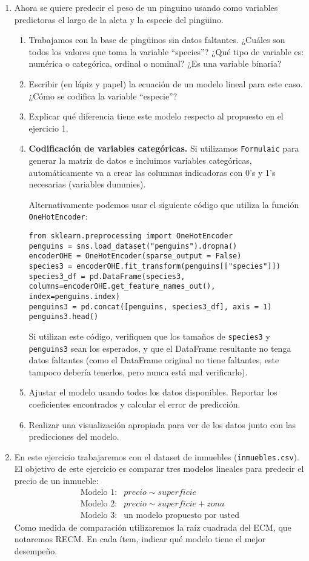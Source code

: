 \documentclass[a4paper,11pt]{article}
\theoremstyle{definition}
\begin{document}
\begin{enumerate}
\item Ahora se quiere predecir el peso de un pinguino usando como variables predictoras el largo de la aleta y la especie del ping\"uino.
\begin{enumerate}
\item Trabajamos con la base de ping\"uinos sin datos faltantes. ¿Cu\'ales son todos los valores que toma la variable ``species''? ¿Qu\'e tipo de variable es: numérica o categórica, ordinal o nominal? ¿Es una variable binaria?
\item Escribir (en lápiz y papel) la ecuación de un modelo lineal para este caso. ¿Cómo se codifica la variable “especie”?
\item Explicar qué diferencia tiene este modelo respecto al propuesto en el ejercicio 1.
\item \textbf{Codificación de variables categóricas.}  Si utilizamos \lstinline{Formulaic} para generar la matriz de datos e incluimos variables categóricas, automáticamente va a crear las columnas indicadoras con 0's y 1's necesarias (variables dummies).
    
    Alternativamente podemos usar el siguiente código que utiliza la función \lstinline{OneHotEncoder}:
\begin{lstlisting}
from sklearn.preprocessing import OneHotEncoder
penguins = sns.load_dataset("penguins").dropna()
encoderOHE = OneHotEncoder(sparse_output = False)
species3 = encoderOHE.fit_transform(penguins[["species"]])
species3_df = pd.DataFrame(species3, columns=encoderOHE.get_feature_names_out(), index=penguins.index)
penguins3 = pd.concat([penguins, species3_df], axis = 1)
penguins3.head()
\end{lstlisting}

Si utilizan este código, verifiquen que los tama\~nos de \lstinline{species3} y \lstinline{penguins3} sean los esperados, y que el DataFrame resultante no tenga datos faltantes (como el DataFrame original no tiene faltantes, este tampoco debería tenerlos, pero nunca está mal verificarlo).

\item Ajustar el modelo usando todos los datos disponibles. Reportar los coeficientes encontrados y calcular el error de predicción.
\item Realizar una visualización apropiada para ver de los datos junto con las predicciones del modelo.
\end{enumerate}

\item En este ejercicio trabajaremos con el dataset de inmuebles (\verb|inmuebles.csv|). El objetivo de este ejercicio es comparar tres modelos lineales para predecir el precio de un inmueble:
\[
\begin{array}{rl}
    \text{Modelo 1:} &  precio \sim superficie \\
    \text{Modelo 2:} &  precio \sim superficie + zona \\
    \text{Modelo 3:} &  \text{un modelo propuesto por usted}
\end{array}
\]
Como medida de comparación utilizaremos la raíz cuadrada del ECM, que notaremos RECM. En cada ítem, indicar qué modelo tiene el mejor desempeño.


\end{enumerate}
\end{document}
